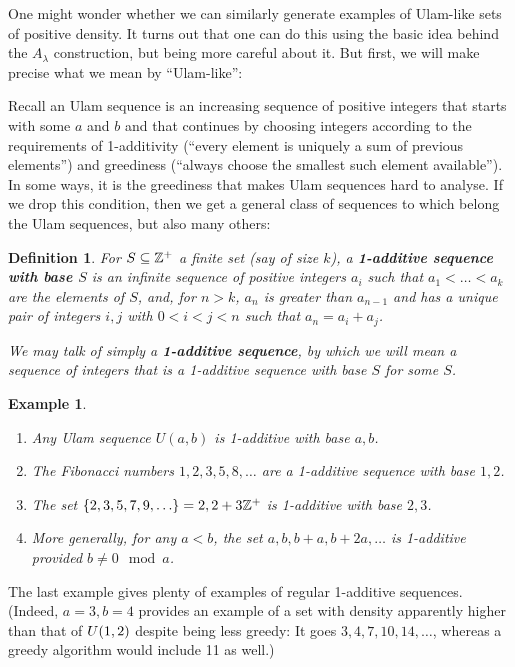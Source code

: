 \documentclass{report}
\newtheorem{definition}[theorem]{Definition}
\newtheorem{example}{Example}
\theoremstyle{remark}
\numberwithin{equation}{section}
\begin{document}
One might wonder whether we can similarly generate examples of
Ulam-like sets of positive density.  It turns out that one can do this
using the basic idea behind the $A_\lambda$ construction, but being
more careful about it.  But first, we will make precise what we mean
by ``Ulam-like'': 

Recall an Ulam sequence is an increasing sequence of positive integers
that starts with some $a$ and $b$ and that continues by choosing
integers according to the requirements of 1-additivity (``every
element is uniquely a sum of previous elements'') and greediness
(``always choose the smallest such element available'').  In some
ways, it is the greediness that makes Ulam sequences hard to analyse.
If we drop this condition, then we get a general class of sequences to
which belong the Ulam sequences, but also many others:

\begin{definition}\label{def:1additive}
  For $S \subseteq \mathbb{Z}^+$ a finite set (say of size $k$), a
  \textbf{1-additive sequence with base $S$} is an infinite sequence
  of positive integers $a_i$ such that $a_1 < \ldots < a_k$ are the
  elements of $S$, and, for $n > k$, $a_n$ is greater than $a_{n-1}$
  and has a unique pair of integers $i, j$ with $0 < i < j < n$ such
  that $a_n = a_i + a_j$.

  We may talk of simply a \textbf{1-additive sequence}, by which we
  will mean a sequence of integers that is a 1-additive sequence with
  base $S$ for some $S$.
\end{definition}

\begin{example}
  \begin{enumerate}
  \item Any Ulam sequence $U(a,b)$ is 1-additive with base $a, b$.  
  \item The Fibonacci numbers $1, 2, 3, 5, 8, \ldots$ are a 1-additive
    sequence with base $1, 2$.  
  \item The set $\{2, 3, 5, 7, 9, \ldots\} = 2, 2+3\mathbb{Z}^+$ is 1-additive
    with base $2, 3$.  
  \item More generally, for any $a < b$, the set $a, b, b+a, b+2a,
    \ldots$ is 1-additive provided $b \neq 0 \mod{a}$.  
  \end{enumerate}
\end{example}

The last example gives plenty of examples of regular 1-additive
sequences.  (Indeed, $a = 3, b = 4$ provides an example of a set with
density apparently higher than that of $U(1,2)$ despite being
less greedy: It goes $3, 4, 7, 10, 14, \ldots$, whereas a greedy
algorithm would include 11 as well.)  
\end{document}
